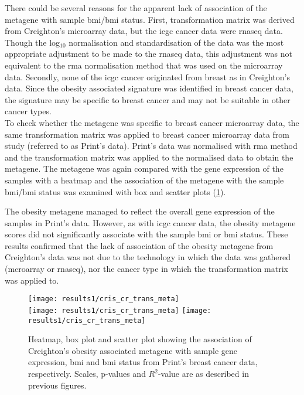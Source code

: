 There could be several reasons for the apparent lack of association of the metagene with sample \gls{bmi}/\gls{bmi} status.
First, transformation matrix was derived from Creighton's microarray data, but the \gls{icgc} cancer data were \gls{rnaseq} data.
Though the log$_{10}$ normalisation and standardisation of the data was the most appropriate adjustment to be made to the \gls{rnaseq} data, this adjustment was not equivalent to the \gls{rma} normalisation method that was used on the microarray data.
Secondly, none of the \gls{icgc} cancer originated from breast as in Creighton's data.
Since the obesity associated signature was identified in breast cancer data, the signature may be specific to breast cancer and may not be suitable in other cancer types.
\\

\noindent
To check whether the metagene was specific to breast cancer microarray data, the same transformation matrix was applied to breast cancer microarray data from \citet{Print2016} study (referred to as Print's data).
Print's data was normalised with \gls{rma} method and the transformation matrix was applied to the normalised data to obtain the metagene.
The metagene was again compared with the gene expression of the samples with a heatmap and the association of the metagene with the sample \gls{bmi}/\gls{bmi} status was examined with box and scatter plots (\cref{fig:crmetaprint}).

The obesity metagene managed to reflect the overall gene expression of the samples in Print's data.
However, as with \gls{icgc} cancer data, the obesity metagene scores did not significantly associate with the sample \gls{bmi} or \gls{bmi} status.
These results confirmed that the lack of association of the obesity metagene from Creighton's data was not due to the technology in which the data was gathered (mcroarray or \gls{rnaseq}), nor the cancer type in which the transformation matrix was applied to.

\begin{figure}[htp!]
	\centering
	\texttt{[image: results1/cris\_cr\_trans\_meta]}\\
	\vspace{1em}
	\texttt{[image: results1/cris\_cr\_trans\_meta]}
	\hfill
	\texttt{[image: results1/cris\_cr\_trans\_meta]}
	\caption[Creighton's metagene in Print's breast cancer data]{Heatmap, box plot and scatter plot showing the association of Creighton's obesity associated metagene with sample gene expression, \gls{bmi} and \gls{bmi} status from Print's breast cancer data, respectively.
	Scales, p-values and $R^2$-value are as described in previous figures.}
	\label{fig:crmetaprint}
\end{figure}

